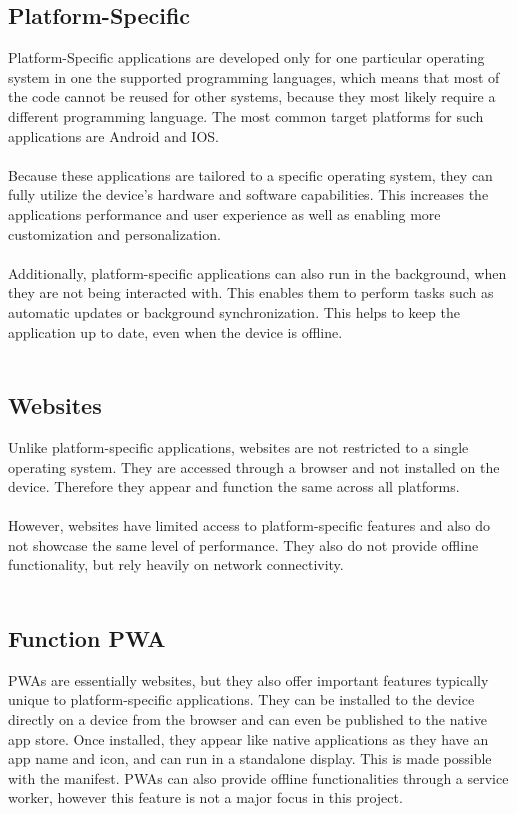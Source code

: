 \documentclass[a4paper,12pt]{report}
\begin{document}
\subsection{Platform-Specific}
Platform-Specific applications are developed only for one particular operating system in one the supported programming languages, which means that most of the code cannot be reused for other systems, because they most likely require a different programming language. The most common target platforms for such applications are Android and IOS. \\\\
Because these applications are tailored to a specific operating system, they can fully utilize the device’s hardware and software capabilities. This increases the applications performance and user experience as well as enabling more customization and personalization. \parencite{native-apps} \\\\
Additionally, platform-specific applications can also run in the background, when they are not being interacted with. This enables them to perform tasks such as automatic updates or background synchronization. This helps to keep the application up to date, even when the device is offline. \parencite{mdn-pwa} \\\\
\subsection{Websites}
Unlike platform-specific applications, websites are not restricted to a single operating system. They are accessed through a browser and not installed on the device. Therefore they appear and function the same across all platforms. \parencite{mdn-pwa} \\\\
However, websites have limited access to platform-specific features and also do not showcase the same level of performance. They also do not provide offline functionality, but rely heavily on network connectivity. \\\\
\subsection{Function PWA}
PWAs are essentially websites, but they also offer important features typically unique to platform-specific applications. They can be installed to the device directly on a device from the browser and can even be published to the native app store. Once installed, they appear like native applications as they have an app name and icon, and can run in a standalone display. This is made possible with the manifest. PWAs can also provide offline functionalities through a service worker, however this feature is not a major focus in this project. \parencite{mdn-pwa}
\end{document}
